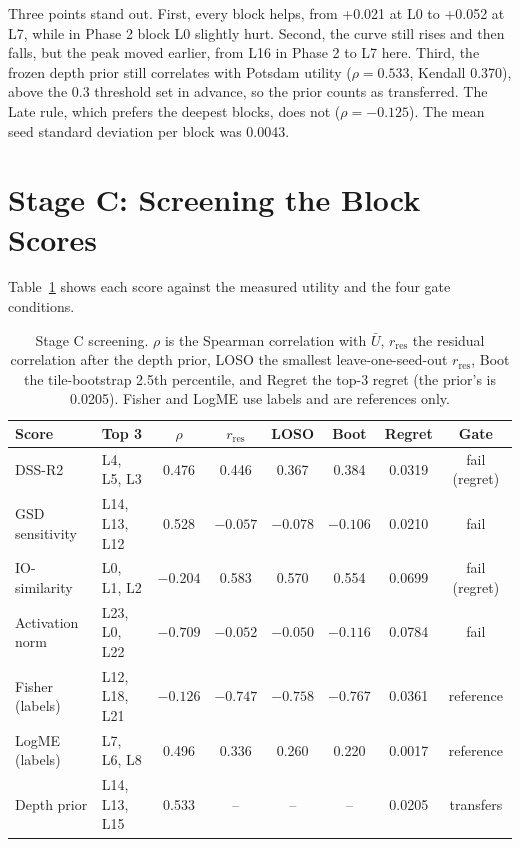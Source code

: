 \documentclass[11pt,a4paper]{report}
\begin{document}
Three points stand out. First, every block helps, from +0.021 at L0 to +0.052 at L7, while in Phase 2 block L0 slightly hurt. Second, the curve still rises and then falls, but the peak moved earlier, from L16 in Phase 2 to L7 here. Third, the frozen depth prior still correlates with Potsdam utility ($\rho = 0.533$, Kendall 0.370), above the 0.3 threshold set in advance, so the prior counts as transferred. The Late rule, which prefers the deepest blocks, does not ($\rho = -0.125$). The mean seed standard deviation per block was 0.0043.

\section{Stage C: Screening the Block Scores}

Table~\ref{tab:gate} shows each score against the measured utility and the four gate conditions.

\begin{table}[t]
\centering
\caption{Stage C screening. $\rho$ is the Spearman correlation with $\bar U$, $r_{\text{res}}$ the residual correlation after the depth prior, LOSO the smallest leave-one-seed-out $r_{\text{res}}$, Boot the tile-bootstrap 2.5th percentile, and Regret the top-3 regret (the prior's is 0.0205). Fisher and LogME use labels and are references only.}
\label{tab:gate}
\small
\begin{tabular}{@{}llcccccc@{}}
\toprule
\textbf{Score} & \textbf{Top 3} & \textbf{$\rho$} & \textbf{$r_{\text{res}}$} & \textbf{LOSO} & \textbf{Boot} & \textbf{Regret} & \textbf{Gate} \\
\midrule
DSS-R2 & L4, L5, L3 & 0.476 & 0.446 & 0.367 & 0.384 & 0.0319 & fail (regret) \\
GSD sensitivity & L14, L13, L12 & 0.528 & $-0.057$ & $-0.078$ & $-0.106$ & 0.0210 & fail \\
IO-similarity & L0, L1, L2 & $-0.204$ & 0.583 & 0.570 & 0.554 & 0.0699 & fail (regret) \\
Activation norm & L23, L0, L22 & $-0.709$ & $-0.052$ & $-0.050$ & $-0.116$ & 0.0784 & fail \\
\midrule
Fisher (labels) & L12, L18, L21 & $-0.126$ & $-0.747$ & $-0.758$ & $-0.767$ & 0.0361 & reference \\
LogME (labels) & L7, L6, L8 & 0.496 & 0.336 & 0.260 & 0.220 & 0.0017 & reference \\
\midrule
Depth prior & L14, L13, L15 & 0.533 & -- & -- & -- & 0.0205 & transfers \\
\bottomrule
\end{tabular}
\end{table}
\end{document}
